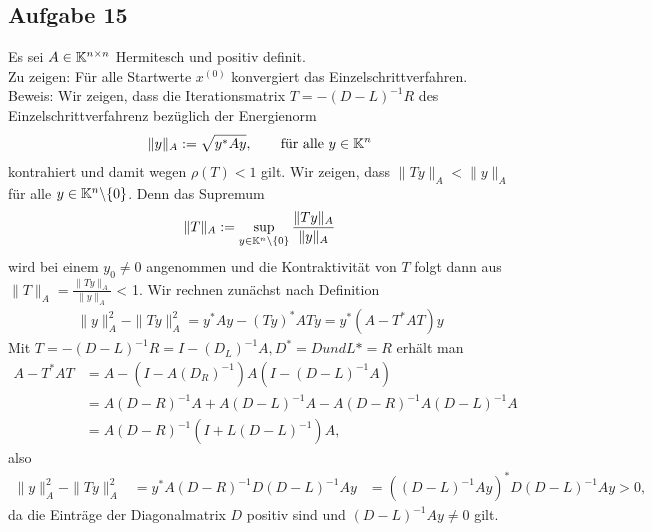 \subsection*{Aufgabe 15}
Es sei $A \in \mathbb K^{n\times n}$ Hermitesch und positiv definit.\\
Zu zeigen: Für alle Startwerte $x^{(0)}$ konvergiert das Einzelschrittverfahren.\\
Beweis: Wir zeigen, dass die Iterationsmatrix $T = -(D-L)^{-1}R$ des Einzelschrittverfahrenz bezüglich der Energienorm
\begin{align*}
	\| y \|_A := \sqrt{y^*Ay},\qquad \text{für alle $y \in \mathbb K^n$}
\end{align*}
kontrahiert und damit wegen $\rho(T)<1$ gilt. Wir zeigen, dass $\| Ty \|_A < \| y \|_A$ für alle $y \in \mathbb K^n \backslash \{0\}$. Denn das Supremum
\begin{align*}
\| T \|_A := \sup_{y \in \mathbb K^n \backslash \{0\}} \frac{\| Ty \|_A}{\| y \|_A}
\end{align*}
wird bei einem $y_0 \neq 0$ angenommen und die Kontraktivität von $T$ folgt dann aus $\| T \|_A = \frac{\| Ty \|_A}{\| y \|_A}$ < 1. Wir rechnen zunächst nach Definition
\begin{align*}
\| y \|_A^2 - \| Ty \|_A^2 = y^*Ay - (Ty)^*ATy = y^*(A-T^*AT)y
\end{align*}
Mit $T = -(D-L)^{-1}R = I-(D_L)^{-1}A, D^* = D und L* = R$ erhält man
\begin{align*}
A-T^*AT &= A - (I-A(D_R)^{-1})A(I-(D-L)^{-1}A)\\
&= A(D-R)^{-1}A+A(D-L)^{-1}A-A(D-R)^{-1}A(D-L)^{-1}A\\
&=A(D-R)^{-1}(I+L(D-L)^{-1})A,
\end{align*}
also
\begin{align*}
\| y \|_A^2 - \| Ty \|_A^2 &= y^*A(D-R)^{-1}D(D-L)^{-1}Ay
&=((D-L)^{-1}Ay)^*D(D-L)^{-1}Ay > 0,
\end{align*}
da die Einträge der Diagonalmatrix $D$ positiv sind und $(D-L)^{-1}Ay \neq 0$ gilt.